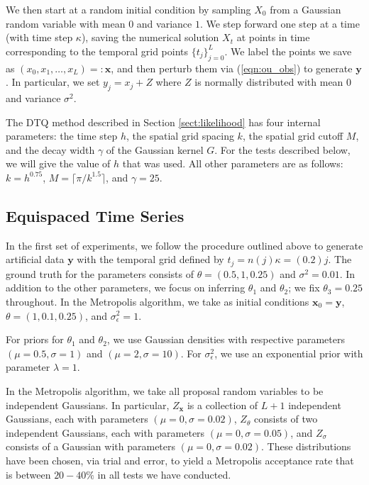 \documentclass[wcp]{jmlr}
\begin{document}
We then start at a
random initial condition by sampling $X_0$ from a Gaussian random
variable with mean $0$ and variance $1$.  We step forward one step at
a time (with time step $\kappa$), saving the numerical solution $X_t$
at points in time corresponding to the temporal grid points $\{t_j\}_{j=0}^L$.
We label the points we save as $(x_0, x_1, \ldots, x_L) =:
\mathbf{x}$, and then perturb them via (\ref{eqn:ou_obs}) to generate
$\mathbf{y}$.  In particular, we set $y_j = x_j + Z$ where $Z$ is
normally distributed with mean $0$ and variance $\sigma^2$.

The DTQ method described in Section \ref{sect:likelihood} has four
internal parameters: the time step $h$, the spatial grid spacing $k$,
the spatial grid cutoff $M$, and the decay width $\gamma$ of the Gaussian
kernel $G$.  For the tests described below, we will give the value of
$h$ that was used.  All other parameters are as follows: $k =
h^{0.75}$, $M = \lceil \pi/k^{1.5} \rceil$, and $\gamma = 25$.

\subsection{Equispaced Time Series}
\label{sect:equispaced}
In the first set of experiments, we follow the procedure outlined
above to generate artificial data $\mathbf{y}$ with the temporal grid
defined by $t_j = n(j) \kappa = (0.2) j$.  The ground truth for the
parameters consists of $\theta = (0.5, 1, 0.25)$ and $\sigma^2 =
0.01$.  In addition to the other parameters, we
focus on inferring $\theta_1$ and $\theta_2$; we fix $\theta_3 =
0.25$ throughout.  In the Metropolis algorithm, we take as initial conditions
$\mathbf{x}_0 = \mathbf{y}$, $\theta = (1,0.1,0.25)$, and
$\sigma_\epsilon^2 = 1$.

For priors for $\theta_1$ and $\theta_2$, we use Gaussian densities
with respective parameters $(\mu=0.5,\sigma=1)$ and
$(\mu=2,\sigma=10)$.  For $\sigma_\epsilon^2$, we use an exponential
prior with parameter $\lambda=1$.

In the Metropolis algorithm, we take all proposal random variables to
be independent Gaussians.  In particular, $Z_\mathbf{x}$ is a collection of
$L+1$ independent Gaussians, each with parameters
$(\mu=0,\sigma=0.02)$, $Z_\theta$ consists of two independent
Gaussians, each with parameters $(\mu=0,\sigma=0.05)$, and $Z_\sigma$
consists of a Gaussian with parameters $(\mu=0,\sigma=0.02)$.  These
distributions have been chosen, via trial and error, to yield a
Metropolis acceptance rate that is between $20-40\%$ in all tests we
have conducted.
\end{document}
